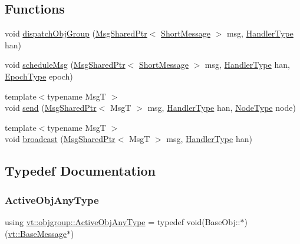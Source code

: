 \subsection*{Functions}
\begin{DoxyCompactItemize}
\item 
void \hyperlink{namespacevt_1_1objgroup_a8eab3eb6e73bbc92bce100e13a01a795}{dispatch\+Obj\+Group} (\hyperlink{namespacevt_ab2b3d506ec8e8d1540aede826d84a239}{Msg\+Shared\+Ptr}$<$ \hyperlink{namespacevt_a1125ac1da6c0bbf141e0ea0739d7602d}{Short\+Message} $>$ msg, \hyperlink{namespacevt_af64846b57dfcaf104da3ef6967917573}{Handler\+Type} han)
\item 
void \hyperlink{namespacevt_1_1objgroup_ab154142df9cf5401462e1b4cabb3b480}{schedule\+Msg} (\hyperlink{namespacevt_ab2b3d506ec8e8d1540aede826d84a239}{Msg\+Shared\+Ptr}$<$ \hyperlink{namespacevt_a1125ac1da6c0bbf141e0ea0739d7602d}{Short\+Message} $>$ msg, \hyperlink{namespacevt_af64846b57dfcaf104da3ef6967917573}{Handler\+Type} han, \hyperlink{namespacevt_a985a5adf291c34a3ca263b3378388236}{Epoch\+Type} epoch)
\item 
{\footnotesize template$<$typename MsgT $>$ }\\void \hyperlink{namespacevt_1_1objgroup_aa2e134493c6b8a23d7d5e86bd9df1a70}{send} (\hyperlink{namespacevt_ab2b3d506ec8e8d1540aede826d84a239}{Msg\+Shared\+Ptr}$<$ MsgT $>$ msg, \hyperlink{namespacevt_af64846b57dfcaf104da3ef6967917573}{Handler\+Type} han, \hyperlink{namespacevt_a866da9d0efc19c0a1ce79e9e492f47e2}{Node\+Type} node)
\item 
{\footnotesize template$<$typename MsgT $>$ }\\void \hyperlink{namespacevt_1_1objgroup_a1e6ef433bb1132944aba030b2a48d12d}{broadcast} (\hyperlink{namespacevt_ab2b3d506ec8e8d1540aede826d84a239}{Msg\+Shared\+Ptr}$<$ MsgT $>$ msg, \hyperlink{namespacevt_af64846b57dfcaf104da3ef6967917573}{Handler\+Type} han)
\end{DoxyCompactItemize}


\subsection{Typedef Documentation}
\mbox{\label{namespacevt_1_1objgroup_a25bec5d3c8e8bb02b62280eec62b8ac7}} 
\subsubsection{\texorpdfstring{Active\+Obj\+Any\+Type}{ActiveObjAnyType}}
{\footnotesize\ttfamily using \hyperlink{namespacevt_1_1objgroup_a25bec5d3c8e8bb02b62280eec62b8ac7}{vt\+::objgroup\+::\+Active\+Obj\+Any\+Type} = typedef void(Base\+Obj\+::$\ast$)(\hyperlink{namespacevt_ac34f95a5e2b8109b55bfba52b074443d}{vt\+::\+Base\+Message}$\ast$)}

